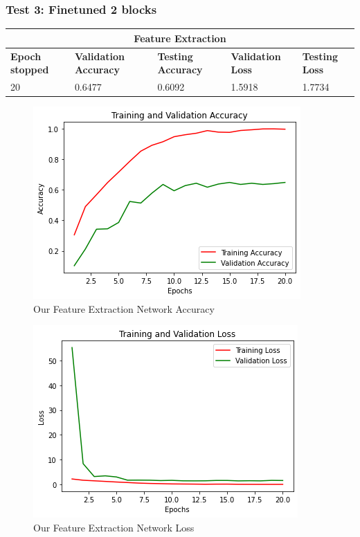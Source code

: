 \subsubsection{Test 3: Finetuned 2 blocks}

\begin{tabular}{ |p{2cm}|p{2cm}|p{2cm}|p{2cm}|p{2cm}|  }
\hline
\multicolumn{5}{|c|}{Feature Extraction} \\
\hline
\textbf{Epoch stopped} & \textbf{Validation Accuracy} & \textbf{Testing Accuracy} & \textbf{Validation Loss} & \textbf{Testing Loss} \\
\hline
20 & 0.6477 & 0.6092 & 1.5918 & 1.7734\\
\hline
\end{tabular}

\begin{figure}[H]
	\centering
	\includegraphics[height=0.45\textwidth]{img/resnet50v2/resnet50finetuned2acc.png}
	\caption{Our Feature Extraction Network Accuracy}
	\label{fig:resnet50finetuned2acc}
\end{figure}

\begin{figure}[H]
	\centering
	\includegraphics[height=0.45\textwidth]{img/resnet50v2/resnet50finetuned2loss.png}
	\caption{Our Feature Extraction Network Loss}
	\label{fig:resnet50finetuned2loss}
\end{figure}

